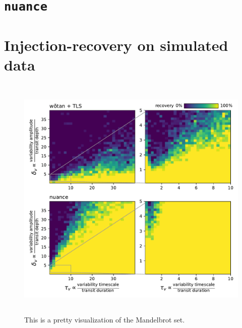 \documentclass{aastex631}
\begin{document}
\section{\texttt{nuance}}

\section{Injection-recovery on simulated data}

\begin{figure}[H]
    \begin{centering}
        \includegraphics[height=12cm]{../../workflows/synthetic_injection_recovery/figures/final_result.pdf}
        \caption{This is a pretty visualization of the Mandelbrot set.}
        \label{fig:simu}
    \end{centering}
\end{figure}


\end{document}
